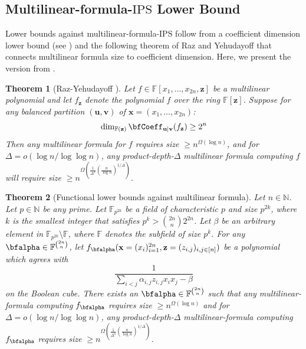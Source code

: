 \documentclass[11pt]{article}
\newtheorem{theorem}{Theorem}[section]
\newcommand{\F}{\mathbb{F}}
\renewcommand{\comment}[2]{\marginpar{\tiny{\textbf{#1: }\textit{#2}}}}
\newcommand{\ssr}[1]{\comment{SS}{#1}}
\newcommand{\IPS}{\mathrm{IPS}}
\begin{document}
\subsection{Multilinear-formula-$\IPS$ Lower Bound}

Lower bounds against multilinear-formula-$\IPS$ follow from a coefficient dimension lower bound (see ) and the following theorem of Raz and Yehudayoff that connects multilinear formula size to coefficient dimension. Here, we present the version from \cite[Theorem 3.13]{FSTW21}.

\begin{theorem}[Raz-Yehudayoff \cite{RY09}\cite{Raz-2009}]
    Let $f \in \F[x_1, \dots, x_{2n}, \mathbf{z}]$ be a multilinear polynomial and let $f_{\mathbf{z}}$ denote the polynomial $f$ over the ring $\F[\mathbf{z}]$. Suppose for any balanced partition $(\mathbf{u}, \mathbf{v})$ of $\mathbf{x} = (x_1, \dots, x_{2n})$: $$\dim_{\F(\mathbf{z})} \bfCoeff_{\mathbf{u} | \mathbf{v}}(f_\mathbf{z}) \geq 2^n$$
    Then any multilinear formula for $f$ requires size $\geq n^{\Omega(\log n)}$, and for $\Delta = o(\log n / \log \log n)$, any product-depth-$\Delta$ multilinear formula computing $f$ will require size $\geq n^{\Omega\left(\frac{1}{\Delta^2}(\frac{n}{\log n})^{1/\Delta}\right )}$. 
\end{theorem}
\begin{theorem}[Functional lower bounds against multilinear formula]\label{thm:multilinear-formula-lbds-via-raz-yehudayoff}
    Let $n\in \mathbb{N}$. Let $p\in \mathbb{N}$ be any prime. Let $\F_{p^{2k}}$ be a field of characteristic $p$ and size $p^{2k}$, where $k$ is the smallest integer that satisfies $p^k > \binom{2n}{n}2^{2n}$. Let $\beta$ be an arbitrary element in $\F_{p^{2k}}\setminus\F$, where $\F$ denotes the subfield of size $p^k$. For any $\bfalpha \in \F^{\binom{2n}{n}}$, let $f_{\bfalpha}(\mathbf{x}=(x_i)_{i=1}^{2n},\mathbf{z}=(z_{i,j})_{i,j\in[n]})$ be a polynomial which agrees with $$\frac{1}{\sum_{i<j}\alpha_{i,j}z_{i,j}x_ix_j - \beta}$$ on the Boolean cube. There exists an $\bfalpha \in \F^{\binom{2n}{n}}$ such that any multilinear-formula computing $f_{\bfalpha}$ requires size $\geq n^{\Omega(\log n)}$ and for $\Delta = o(\log n / \log \log n)$, any product-depth-$\Delta$ multilinear-formula computing $f_{\bfalpha}$ requires size $\geq n^{\Omega\left(\frac{1}{\Delta^2}(\frac{n}{\log n})^{1/\Delta}\right )}$. 
\end{theorem}
\end{document}
